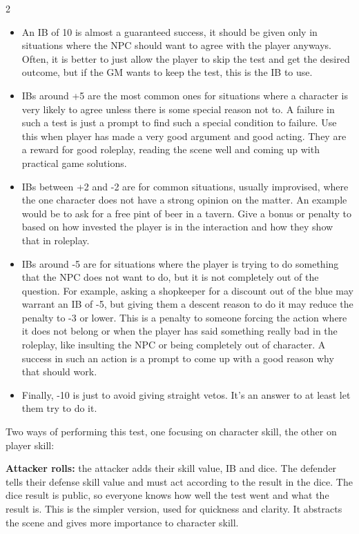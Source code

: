 \begin{multicols}{2}
\begin{itemize}
  \item An IB of 10 is almost a guaranteed success, it should be given only in situations where the NPC should want to agree with the player anyways. Often, it is better to just allow the player to skip the test and get the desired outcome, but if the GM wants to keep the test, this is the IB to use.
  \item IBs around +5 are the most common ones for situations where a character is very likely to agree unless there is some special reason not to. A failure in such a test is just a prompt to find such a special condition to failure. Use this when player has made a very good argument and good acting. They are a reward for good roleplay, reading the scene well and coming up with practical game solutions.
  \item IBs between +2 and -2 are for common situations, usually improvised, where the one character does not have a strong opinion on the matter. An example would be to ask for a free pint of beer in a tavern. Give a bonus or penalty to based on how invested the player is in the interaction and how they show that in roleplay.
  \item IBs around -5 are for situations where the player is trying to do something that the NPC does not want to do, but it is not completely out of the question. For example, asking a shopkeeper for a discount out of the blue may warrant an IB of -5, but giving them a descent reason to do it may reduce the penalty to -3 or lower. This is a penalty to someone forcing the action where it does not belong or when the player has said something really bad in the roleplay, like insulting the NPC or being completely out of character. A success in such an action is a prompt to come up with a good reason why that should work.
  \item Finally, -10 is just to avoid giving straight vetos. It's an answer to at least let them try to do it.
\end{itemize}

Two ways of performing this test, one focusing on character skill, the other on player skill:

\textbf{Attacker rolls:} the attacker adds their skill value, IB and dice. The defender tells their defense skill value and must act according to the result in the dice. The dice result is public, so everyone knows how well the test went and what the result is. This is the simpler version, used for quickness and clarity. It abstracts the scene and gives more importance to character skill.


\end{multicols}
